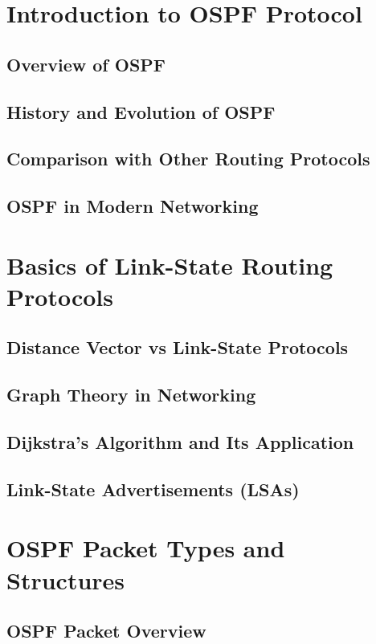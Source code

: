 \documentclass{book}
\begin{document}
\tableofcontents

\chapter{Introduction to OSPF Protocol}
    \section{Overview of OSPF}
    \section{History and Evolution of OSPF}
    \section{Comparison with Other Routing Protocols}
    \section{OSPF in Modern Networking}
    
\chapter{Basics of Link-State Routing Protocols}
    \section{Distance Vector vs Link-State Protocols}
    \section{Graph Theory in Networking}
    \section{Dijkstra's Algorithm and Its Application}
    \section{Link-State Advertisements (LSAs)}
    
\chapter{OSPF Packet Types and Structures}
    \section{OSPF Packet Overview}
\end{document}
